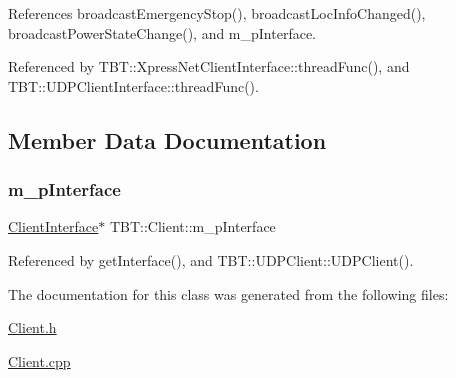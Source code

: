 References broadcast\+Emergency\+Stop(), broadcast\+Loc\+Info\+Changed(), broadcast\+Power\+State\+Change(), and m\+\_\+p\+Interface.



Referenced by T\+B\+T\+::\+Xpress\+Net\+Client\+Interface\+::thread\+Func(), and T\+B\+T\+::\+U\+D\+P\+Client\+Interface\+::thread\+Func().



\subsection{Member Data Documentation}
\mbox{\label{classTBT_1_1Client_a0b3e41f73f6381600c8ddac129b740f6_a0b3e41f73f6381600c8ddac129b740f6}} 
\subsubsection{\texorpdfstring{m\+\_\+p\+Interface}{m\_pInterface}}
{\footnotesize\ttfamily \hyperlink{classTBT_1_1ClientInterface}{Client\+Interface}$\ast$ T\+B\+T\+::\+Client\+::m\+\_\+p\+Interface\hspace{0.3cm}{\ttfamily [protected]}}



Referenced by get\+Interface(), and T\+B\+T\+::\+U\+D\+P\+Client\+::\+U\+D\+P\+Client().



The documentation for this class was generated from the following files\+:\begin{DoxyCompactItemize}
\item 
\hyperlink{Client_8h}{Client.\+h}\item 
\hyperlink{Client_8cpp}{Client.\+cpp}\end{DoxyCompactItemize}
